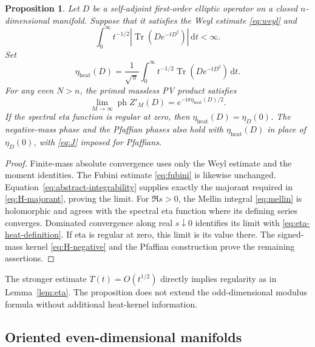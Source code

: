 \documentclass[11pt,a4paper]{article}
\newtheorem{proposition}[theorem]{Proposition}
\theoremstyle{remark}
\DeclareMathOperator{\Tr}{Tr}
\DeclareMathOperator{\ph}{ph}
\newcommand{\ii}{\mathrm i}
\newcommand{\dd}{\,\mathrm d}
\numberwithin{equation}{section}
\begin{document}
\begin{proposition}\label{prop:abstract}
Let $D$ be a self-adjoint first-order elliptic operator on a closed
$n$-dimensional manifold. Suppose that it satisfies the Weyl
estimate \eqref{eq:weyl} and
\begin{equation}\label{eq:abstract-integrability}
 \int_0^\infty t^{-1/2}
            |\Tr(De^{-tD^2})|\dd t<\infty.
\end{equation}
Set
\begin{equation}\label{eq:eta-heat-definition}
 \eta_{\mathrm{heat}}(D)=\frac1{\sqrt\pi}
           \int_0^\infty t^{-1/2}\Tr(De^{-tD^2})\dd t.
\end{equation}
For any even $N>n$, the primed massless PV product satisfies
\begin{equation}\label{eq:abstract-phase}
 \lim_{M\to\infty}\ph Z'_M(D)
       =e^{-\ii\pi\eta_{\mathrm{heat}}(D)/2}.
\end{equation}
If the spectral eta function is regular at zero, then
$\eta_{\mathrm{heat}}(D)=\eta_D(0)$.
The negative-mass phase and the Pfaffian phases also hold with
$\eta_{\mathrm{heat}}(D)$ in place of $\eta_D(0)$, with
\eqref{eq:J} imposed for Pfaffians.
\end{proposition}

\begin{proof}
Finite-mass absolute convergence uses only the Weyl estimate and the
moment identities. The Fubini estimate \eqref{eq:fubini} is likewise
unchanged. Equation~\eqref{eq:abstract-integrability} supplies exactly
the majorant required in \eqref{eq:H-majorant}, proving the limit.
For $\Re s>0$, the Mellin integral \eqref{eq:mellin} is holomorphic
and agrees with the spectral eta function where its defining series
converges. Dominated convergence along real $s\downarrow0$ identifies
its limit with \eqref{eq:eta-heat-definition}. If eta is regular at
zero, this limit is its value there. The signed-mass kernel
\eqref{eq:H-negative} and the Pfaffian construction prove the
remaining assertions.
\end{proof}

The stronger estimate $T(t)=O(t^{1/2})$ directly implies regularity
as in Lemma~\ref{lem:eta}. The proposition does not extend the
odd-dimensional modulus formula without additional heat-kernel
information.

\subsection{Oriented even-dimensional manifolds}
\end{document}
